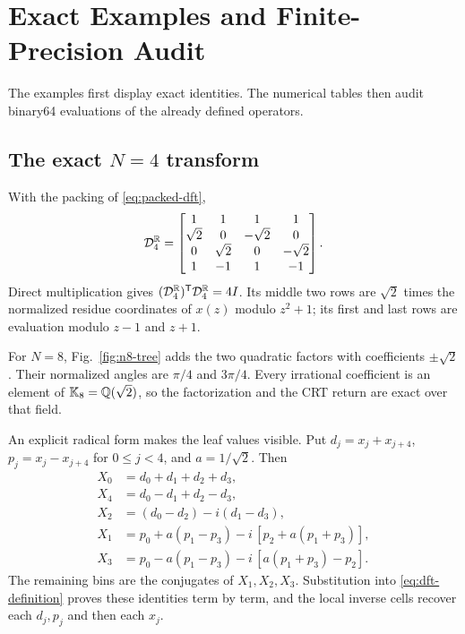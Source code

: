 \section{Exact Examples and Finite-Precision Audit}
\label{sec:audit}

The examples first display exact identities.  The numerical tables then audit
binary64 evaluations of the already defined operators.

\subsection{The exact $N=4$ transform}

With the packing of \eqref{eq:packed-dft},
\begin{equation}
 \mathcal{D}_4^{\mathbb{R}}=
 \begin{bmatrix}
 1&1&1&1\\
 \sqrt2&0&-\sqrt2&0\\
 0&\sqrt2&0&-\sqrt2\\
 1&-1&1&-1
 \end{bmatrix}.
 \label{eq:dft4-matrix}
\end{equation}
Direct multiplication gives
$(\mathcal{D}_4^{\mathbb{R}})^{\mathsf{T}}\mathcal{D}_4^{\mathbb{R}}=4I$.  Its middle two rows are $\sqrt2$
times the normalized residue coordinates of $x(z)$ modulo $z^2+1$; its first and last rows are
evaluation modulo $z-1$ and $z+1$.

For $N=8$, Fig.~\ref{fig:n8-tree} adds the two quadratic factors with
coefficients $\pm\sqrt2$.  Their normalized angles are $\pi/4$ and $3\pi/4$.
Every irrational coefficient is an element of $\mathbb{K}_8=\mathbb Q(\sqrt2)$, so the
factorization and the CRT return are exact over that field.

An explicit radical form makes the leaf values visible.  Put
$d_j=x_j+x_{j+4}$, $p_j=x_j-x_{j+4}$ for $0\le j<4$, and $a=1/\sqrt2$.  Then
\begin{align}
 X_0&=d_0+d_1+d_2+d_3,\\
 X_4&=d_0-d_1+d_2-d_3,\\
 X_2&=(d_0-d_2)-i(d_1-d_3),\\
 X_1&=p_0+a(p_1-p_3)-i\,[p_2+a(p_1+p_3)],\\
 X_3&=p_0-a(p_1-p_3)-i\,[a(p_1+p_3)-p_2].
 \label{eq:n8-radical-spectrum}
\end{align}
The remaining bins are the conjugates of $X_1,X_2,X_3$.  Substitution into
\eqref{eq:dft-definition} proves these identities term by term, and the local
inverse cells recover each $d_j,p_j$ and then each $x_j$.

